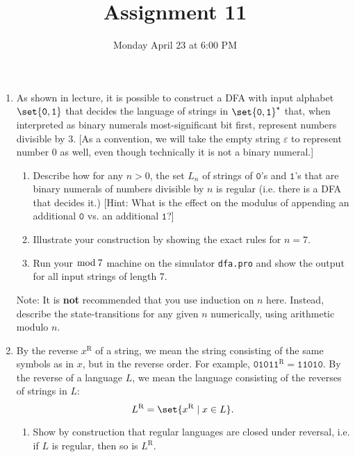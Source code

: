 \documentclass{cs81-homework}
\title{Assignment 11}
\date{Monday April 23 at 6:00 PM}
\author{}
\newcommand{\reverse}{{\text{R}}}
\begin{document}
\begin{introduction}
  \theintroduction
\end{introduction}

\begin{enumerate}
\item {} As shown in lecture, it is possible to construct a DFA with
  input alphabet \(\set{\mathtt 0, \mathtt 1}\) that decides the language of
  strings in \(\set{\mathtt 0, \mathtt 1}^\star\) that, when interpreted as
  binary numerals most-significant bit first, represent numbers divisible by 3.
  [As a convention, we will take the empty string \(\varepsilon\) to represent
  number \(0\) as well, even though technically it is not a binary numeral.]
  \begin{enumerate}
  \item Describe how for any \(n>0\), the set \(L_n\) of strings of
    \(\mathtt 0\)'s and \(\mathtt 1\)'s that are binary numerals of numbers
    divisible by \(n\) is regular (i.e. there is a DFA that decides it.)  [Hint:
    What is the effect on the modulus of appending an additional \(\mathtt 0\)
    vs. an additional \(\mathtt 1\)?]

  \item Illustrate your construction by showing the exact rules for \(n=7\).

  \item \label{part:mod-7-dfa} Run your \(\mathop{\bmod} 7\) machine on the
    simulator \texttt{dfa.pro} and show the output for all input strings of
    length 7.
  \end{enumerate}
  Note: It is \textbf{not} recommended that you use induction on \(n\) here.
  Instead, describe the state-transitions for any given \(n\) numerically, using
  arithmetic modulo \(n\).

  \begin{solution}
  \end{solution}

\item {} \label{problem:reverse} By the reverse \(x^\reverse\) of a string,
  we mean the string consisting of the same symbols as in \(x\), but in the
  reverse order.  For example, \(\mathtt{01011}^\reverse = \mathtt{11010}\).  By
  the reverse of a language \(L\), we mean the language consisting of the
  reverses of strings in \(L\):
  \[
    L^\reverse = \set{x^\reverse \mid x \in L}.
  \]
  \begin{enumerate}
  \item Show by construction that regular languages are closed under reversal,
    i.e. if \(L\) is regular, then so is \(L^\reverse\).


\end{enumerate}
\end{enumerate}
\end{document}

